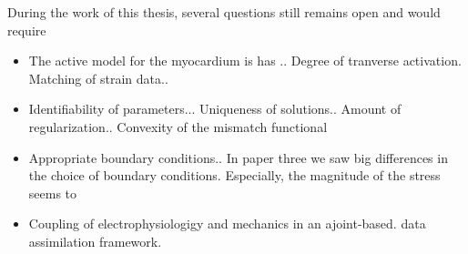 During the work of this thesis, several questions still remains open
and would require

\begin{itemize}
\item The active model for the myocardium is has .. Degree of
  tranverse activation. Matching of strain data..
\item Identifiability of parameters... Uniqueness of
  solutions.. Amount of regularization.. Convexity of the mismatch functional
\item Appropriate boundary conditions.. In paper three we saw big
  differences in the choice of boundary conditions. Especially, the
  magnitude of the stress seems to 
\item Coupling of electrophysiologigy and mechanics in an
  ajoint-based. data assimilation framework. 
\end{itemize}

